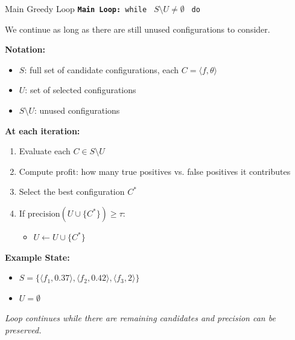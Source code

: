 \documentclass[8pt]{beamer} %
\begin{document}
\begin{frame}{Main Greedy Loop}
	\texttt{\textbf{Main Loop:} while } $S \setminus U \neq \emptyset$ \texttt{ do}
	
	\vspace{0.5em}
	We continue as long as there are still unused configurations to consider.
	
	\vspace{0.5em}
	\textbf{Notation:}
	\begin{itemize}
		\item $S$: full set of candidate configurations, each $C = \langle f, \theta \rangle$
		\item $U$: set of selected configurations
		\item $S \setminus U$: unused configurations
	\end{itemize}
	
	\vspace{0.5em}
	\textbf{At each iteration:}
	\begin{enumerate}
		\item Evaluate each $C \in S \setminus U$
		\item Compute profit: how many true positives vs. false positives it contributes
		\item Select the best configuration $C^*$
		\item If $\text{precision}(U \cup \{C^*\}) \geq \tau$:
		\begin{itemize}
			\item[] \texttt{$U \leftarrow U \cup \{C^*\}$}
		\end{itemize}
	\end{enumerate}
	
	\vspace{0.5em}
	\textbf{Example State:}
	\begin{itemize}
		\item $S = \{ \langle f_1, 0.37 \rangle, \langle f_2, 0.42 \rangle, \langle f_3, 2 \rangle \}$
		\item $U = \emptyset$
	\end{itemize}
	
	\textit{Loop continues while there are remaining candidates and precision can be preserved.}
\end{frame}
\end{document}
